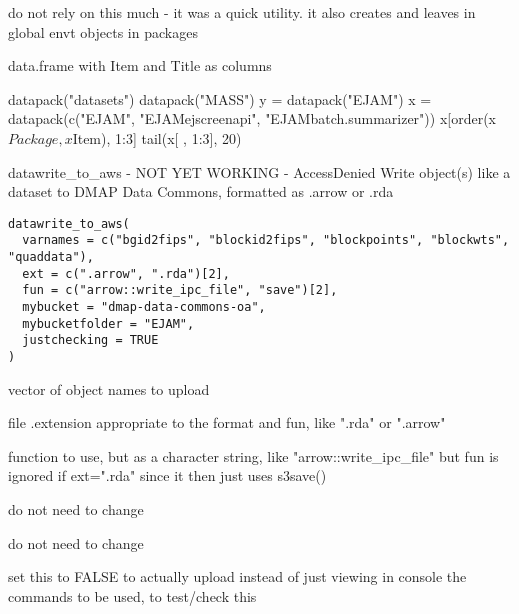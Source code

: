 \documentclass[a4paper]{book}
\begin{document}
%
\begin{Details}\relax
do not rely on this much - it was a quick utility. it also creates and leaves in global envt
objects in packages
\end{Details}
%
\begin{Value}
data.frame with Item and Title as columns
\end{Value}
%
\begin{Examples}
\begin{ExampleCode}
 datapack("datasets")
 datapack("MASS")
 y = datapack("EJAM")
 x = datapack(c("EJAM", "EJAMejscreenapi", "EJAMbatch.summarizer"))
 x[order(x$Package, x$Item), 1:3]
 tail(x[ , 1:3], 20)
\end{ExampleCode}
\end{Examples}
%
\begin{Description}\relax
datawrite\_to\_aws -  NOT YET WORKING - AccessDenied
Write object(s) like a dataset to DMAP Data Commons, formatted as .arrow or .rda
\end{Description}
%
\begin{Usage}
\begin{verbatim}
datawrite_to_aws(
  varnames = c("bgid2fips", "blockid2fips", "blockpoints", "blockwts", "quaddata"),
  ext = c(".arrow", ".rda")[2],
  fun = c("arrow::write_ipc_file", "save")[2],
  mybucket = "dmap-data-commons-oa",
  mybucketfolder = "EJAM",
  justchecking = TRUE
)
\end{verbatim}
\end{Usage}
%
\begin{Arguments}
\begin{ldescription}
\item[\code{varnames}] vector of object names to upload

\item[\code{ext}] file .extension appropriate to the format and fun, like ".rda" or ".arrow"

\item[\code{fun}] function to use, but as a character string, like "arrow::write\_ipc\_file"
but fun is ignored if ext=".rda" since it then just uses s3save()

\item[\code{mybucket}] do not need to change

\item[\code{mybucketfolder}] do not need to change

\item[\code{justchecking}] set this to FALSE to actually upload instead of
just viewing in console the commands to be used, to test/check this
\end{ldescription}
\end{Arguments}
\end{document}
